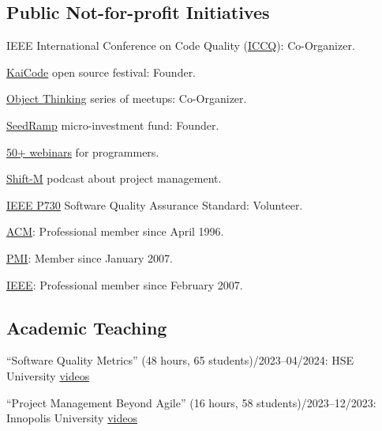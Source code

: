 \documentclass{yb}
\begin{document}
    \subsection*{Public Not-for-profit Initiatives}

    IEEE International Conference on Code Quality (\href{https://www.iccq.ru}{ICCQ}): Co-Organizer.

    \href{https://www.kaicode.org}{KaiCode} open source festival: Founder.

    \href{https://www.meetup.com/Object-Thinking/}{Object Thinking} series of meetups: Co-Organizer.


    \href{https:www.seedramp.com/}{SeedRamp} micro-investment fund: Founder.

    \href{https://www.yegor256.com/webinars.html}{50+ webinars} for programmers.

    \href{https://www.yegor256.com/shift-m.html}{Shift-M} podcast about project management.

    \href{http://ieeexplore.ieee.org/document/6835311/}{IEEE P730} Software Quality Assurance Standard: Volunteer.

    \href{https://www.acm.org}{ACM}: Professional member since April 1996.

    \href{https://certification.pmi.org/registry.aspx}{PMI}: Member since January 2007.

    \href{https://www.ieee.org}{IEEE}: Professional member since February 2007.

    \subsection*{Academic Teaching}

    ``Software Quality Metrics'' (48 hours, 65 students)/2023--04/2024: HSE University\newline
    \href{https://www.youtube.com/playlist?list=PLaIsQH4uc08xyXRhhYPHh-Yam2kEwNaLl}{videos}

    ``Project Management Beyond Agile'' (16 hours, 58 students)/2023--12/2023: Innopolis University\newline
    \href{https://www.youtube.com/playlist?list=PLaIsQH4uc08x_T-Aelduv3Zf0DWRx40pq}{videos}
\end{document}
